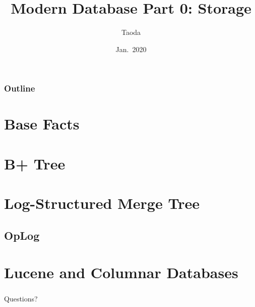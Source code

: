 \documentclass[lualatex]{beamer}
\title[Modern DB: Storage]{Modern Database Part 0: Storage}
\author{Taoda}
\institute{YITU tech}
\date{Jan.\ 2020}
\begin{document}
\begin{frame}
\titlepage
\end{frame}

\begin{frame}
  \frametitle{Outline}
  \tableofcontents
\end{frame}

\section{Base Facts}
\section{B+ Tree}
\section{Log-Structured Merge Tree}
\subsection{OpLog}
\section{Lucene and Columnar Databases}

\begin{frame}
  \frametitle{}
  \begin{center}
    \Huge
    Questions?
  \end{center}
\end{frame}
\end{document}
